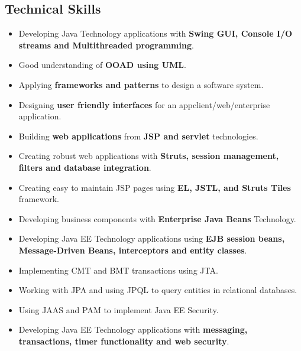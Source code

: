 \documentclass[letterpaper,10pt]{article}
\begin{document}
\subsection*{Technical Skills}
\begin{itemize}
\item Developing Java Technology applications with \textbf{Swing GUI, Console I/O streams and Multithreaded programming}.
\item Good understanding of \textbf{OOAD using UML}.
\item Applying \textbf{frameworks and patterns} to design a software system.
\item Designing \textbf{user friendly interfaces} for an appclient/web/enterprise application.
\item Building \textbf{web applications} from \textbf{JSP and servlet} technologies.
\item Creating robust web applications with \textbf{Struts, session management, filters and database integration}.
\item Creating easy to maintain JSP pages using \textbf{EL, JSTL, and Struts Tiles} framework.
\item Developing business components with \textbf{Enterprise Java Beans} Technology.
\item Developing Java EE Technology applications using \textbf{EJB session beans, Message-Driven Beans, interceptors and entity classes}.
\item Implementing CMT and BMT transactions using JTA.
\item Working with JPA and using JPQL to query entities in relational databases.
\item Using JAAS and PAM to implement Java EE Security.
\item Developing Java EE Technology applications with \textbf{messaging, transactions, timer functionality and web security}.
\end{itemize}
\end{document}
